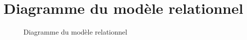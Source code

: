 
\section{Diagramme du modèle relationnel}
    \FloatBarrier
    \begin{figure}[H]
    \begin{center}
    \end{center}
    \caption{Diagramme du modèle relationnel}
    \label{fig:classentity}
    \end{figure}
